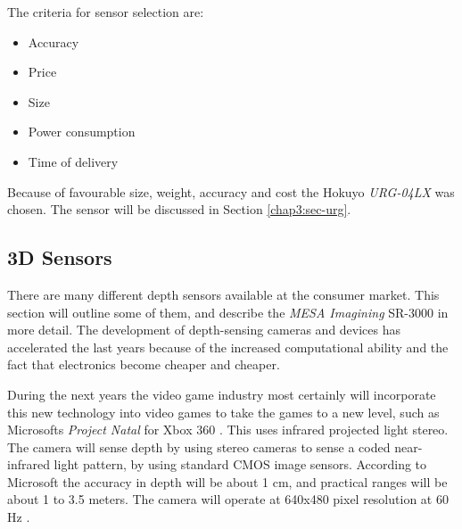 The criteria for sensor selection are:
\begin{itemize}
    \item Accuracy
    \item Price
    \item Size
    \item Power consumption
    \item Time of delivery
\end{itemize}
Because of favourable size, weight, accuracy and cost the Hokuyo \emph{URG-04LX} was
chosen. The sensor will be discussed in Section \ref{chap3:sec-urg}.

\subsection{3D Sensors}
There are many different depth sensors available at the consumer market. This section will
outline some of them, and describe the \emph{MESA Imagining} SR-3000 in more detail.
The development of depth-sensing cameras and devices has accelerated the last years
because of the increased computational ability and the fact that electronics become
cheaper and cheaper. \cite{low-cost-depthcameras}

During the next years the video game industry most certainly will
incorporate this new technology into video games to take the games to a new level, such as
Microsofts \emph{Project Natal} for Xbox 360 \cite{project-natal}. This uses infrared
projected light stereo. The camera will sense depth by using stereo cameras to sense a
coded near-infrared light pattern, by using standard CMOS image sensors. According to
Microsoft the accuracy in depth will be about 1 cm, and practical ranges will be about
1 to 3.5 meters. The camera will operate at 640x480 pixel resolution at 60 Hz
\cite{conceivably-tech}.



